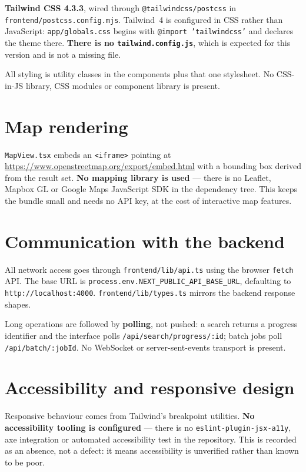 \documentclass[11pt,a4paper]{report}
\newcommand{\code}[1]{\texttt{\small #1}}
\DeclareRobustCommand{\file}[1]{{\small\nolinkurl{#1}}}
\begin{document}
\textbf{Tailwind CSS 4.3.3}, wired through \code{@tailwindcss/postcss} in
\file{frontend/postcss.config.mjs}. Tailwind~4 is configured in CSS rather than
JavaScript: \file{app/globals.css} begins with \code{@import 'tailwindcss'} and
declares the theme there. \textbf{There is no \file{tailwind.config.js}}, which
is expected for this version and is not a missing file.

All styling is utility classes in the components plus that one stylesheet. No
CSS-in-JS library, CSS modules or component library is present.

\section{Map rendering}

\file{MapView.tsx} embeds an \code{<iframe>} pointing at
\url{https://www.openstreetmap.org/export/embed.html} with a bounding box derived
from the result set. \textbf{No mapping library is used} --- there is no Leaflet,
Mapbox GL or Google Maps JavaScript SDK in the dependency tree. This keeps the
bundle small and needs no API key, at the cost of interactive map features.

\section{Communication with the backend}

All network access goes through \file{frontend/lib/api.ts} using the browser
\code{fetch} API. The base URL is \code{process.env.NEXT\_PUBLIC\_API\_BASE\_URL},
defaulting to \code{http://localhost:4000}. \file{frontend/lib/types.ts} mirrors
the backend response shapes.

Long operations are followed by \textbf{polling}, not pushed: a search returns a
progress identifier and the interface polls \file{/api/search/progress/:id};
batch jobs poll \file{/api/batch/:jobId}. No WebSocket or server-sent-events
transport is present.

\section{Accessibility and responsive design}

Responsive behaviour comes from Tailwind's breakpoint utilities. \textbf{No
accessibility tooling is configured} --- there is no \code{eslint-plugin-jsx-a11y},
axe integration or automated accessibility test in the repository. This is
recorded as an absence, not a defect: it means accessibility is unverified rather
than known to be poor.
\end{document}
